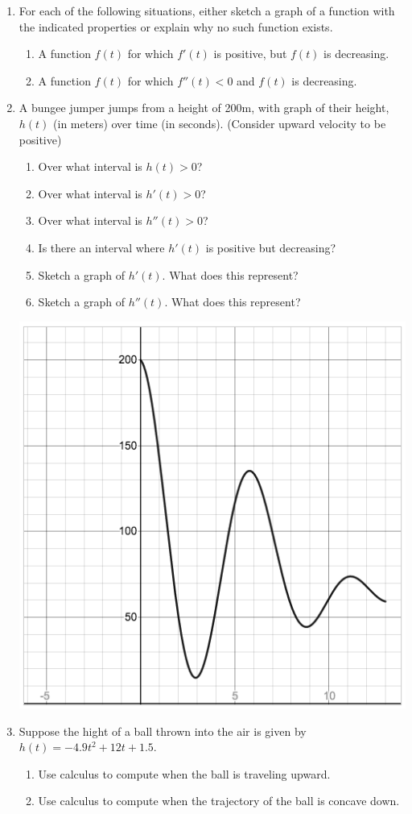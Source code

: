 \documentclass[12pt]{article}
\begin{document}
\begin{enumerate}
\item For each of the following situations, either sketch a graph of a function with the indicated properties or explain why no such function exists. 
	\begin{enumerate}
	\item A function $f(t)$ for which $f'(t)$ is positive, but $f(t)$ is decreasing.
	\vfill
	\item A function $f(t)$ for which $f''(t)<0$ and $f(t)$ is decreasing.
	\vfill
	\end{enumerate}

\item A bungee jumper jumps from a height of 200m, with graph of their height, $h(t)$ (in meters) over time (in seconds). (Consider upward velocity to be positive)
	\begin{enumerate}
	\item Over what interval is $h(t)>0$?
		\vfill
	\item Over what interval is $h'(t)>0$?
		\vfill
	\item Over what interval is $h''(t)>0$?
		\vfill
	\item Is there an interval where $h'(t)$ is positive but decreasing?
		\vfill
	\item Sketch a graph of $h'(t)$. What does this represent?
		\vfill
	\item Sketch a graph of $h''(t)$. What does this represent?
		\vfill
	\end{enumerate}
	 \includegraphics[scale=.3]{2_5_bungee}
	
\item Suppose the hight of a ball thrown into the air is given by $h(t)=-4.9t^2+12t+1.5$.
	\begin{enumerate}
	\item Use calculus to compute when the ball is traveling upward.
	\vfill
	\item Use calculus to compute when the trajectory of the ball is concave down.

	\end{enumerate}
	 
\end{enumerate}
\end{document}
